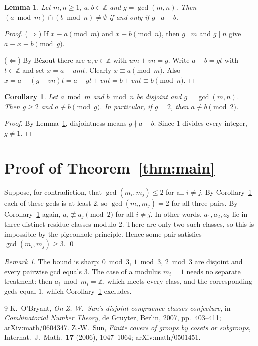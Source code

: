 \documentclass[11pt]{article}
\newtheorem{lemma}[theorem]{Lemma}
\newtheorem{corollary}[theorem]{Corollary}
\theoremstyle{remark}
\newtheorem{remark}[theorem]{Remark}
\theoremstyle{definition}
\begin{document}
\begin{lemma}\label{lem:crt}
Let $m,n\ge1$, $a,b\in\mathbb{Z}$ and $g=\gcd(m,n)$. Then
$(a\bmod m)\cap(b\bmod n)\ne\emptyset$ if and only if $g\mid a-b$.
\end{lemma}

\begin{proof}
($\Rightarrow$) If $x\equiv a\pmod m$ and $x\equiv b\pmod n$, then $g\mid m$ and $g\mid n$ give
$a\equiv x\equiv b\pmod g$.

($\Leftarrow$) By B\'ezout there are $u,v\in\mathbb{Z}$ with $um+vn=g$. Write $a-b=gt$ with
$t\in\mathbb{Z}$ and set $x=a-umt$. Clearly $x\equiv a\pmod m$. Also
$x=a-(g-vn)t=a-gt+vnt=b+vnt\equiv b\pmod n$.
\end{proof}

\begin{corollary}\label{cor:small}
Let $a\bmod m$ and $b\bmod n$ be disjoint and $g=\gcd(m,n)$. Then $g\ge2$ and $a\not\equiv b\pmod g$.
In particular, if $g=2$, then $a\not\equiv b\pmod 2$.
\end{corollary}

\begin{proof}
By Lemma~\ref{lem:crt}, disjointness means $g\nmid a-b$. Since $1$ divides every integer, $g\ne1$.
\end{proof}

\section{Proof of Theorem~\ref{thm:main}}

Suppose, for contradiction, that $\gcd(m_i,m_j)\le2$ for all $i\ne j$. By
Corollary~\ref{cor:small} each of these gcds is at least $2$, so $\gcd(m_i,m_j)=2$ for all three
pairs. By Corollary~\ref{cor:small} again, $a_i\not\equiv a_j\pmod2$ for all $i\ne j$. In other
words, $a_1,a_2,a_3$ lie in three distinct residue classes modulo $2$. There are only two such
classes, so this is impossible by the pigeonhole principle. Hence some pair satisfies
$\gcd(m_i,m_j)\ge3$. \qed

\begin{remark}
The bound is sharp: $0\bmod3$, $1\bmod3$, $2\bmod3$ are disjoint and every pairwise gcd equals $3$.
The case of a modulus $m_i=1$ needs no separate treatment: then $a_i\bmod m_i=\mathbb{Z}$, which meets
every class, and the corresponding gcds equal $1$, which Corollary~\ref{cor:small} excludes.
\end{remark}

\begin{thebibliography}{9}
 K.~O'Bryant, \emph{On Z.-W.\ Sun's disjoint congruence classes conjecture}, in
  \emph{Combinatorial Number Theory}, de Gruyter, Berlin, 2007, pp.~403--411; arXiv:math/0604347.
 Z.-W.~Sun, \emph{Finite covers of groups by cosets or subgroups}, Internat.\ J.\ Math.\
  \textbf{17} (2006), 1047--1064; arXiv:math/0501451.
\end{thebibliography}
\end{document}
